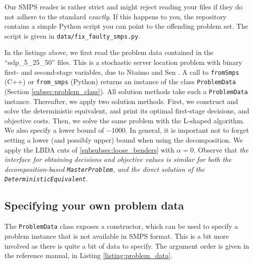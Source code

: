 \documentclass[12pt, english]{article}
\begin{document}
Our SMPS reader is rather strict and might reject reading your files if they do not adhere to the standard \textit{exactly}. If this happens to you, the repository contains a simple Python script you can point to the offending problem set. The script is given in \texttt{data/fix\_faulty\_smps.py}.

In the listings above, we first read the problem data contained in the ``sslp\_5\_25\_50'' files. This is a stochastic server location problem with binary first- and second-stage variables, due to Ntaimo and Sen \cite{ntaimo2005}.  A call to \texttt{fromSmps} (C++) or \texttt{from\_smps} (Python) returns an instance of the class \texttt{ProblemData} (Section \ref{subsec:problem_class}). All solution methods take such a \texttt{ProblemData} instance. Thereafter, we apply two solution methods. First, we construct and solve the deterministic equivalent, and print its optimal first-stage decisions, and objective costs. Then, we solve the same problem with the L-shaped algorithm. We also specify a lower bound of $-1000$. In general, it is important not to forget setting a lower (and possibly upper) bound when using the decomposition. We apply the LBDA cuts of \ref{subsubsec:loose_benders} with $\alpha = 0$. Observe that \emph{the interface for obtaining decisions and objective values is similar for both the decomposition-based \texttt{MasterProblem}, and the direct solution of the \texttt{DeterministicEquivalent}}.

\subsection{Specifying your own problem data}
\label{subsec:own_data_example}

The \texttt{ProblemData} class exposes a constructor, which can be used to specify a problem instance that is not available in SMPS format. This is a bit more involved as there is quite a bit of data to specify. The argument order is given in the reference manual, in Listing \ref{listing:problem_data}.
\end{document}
